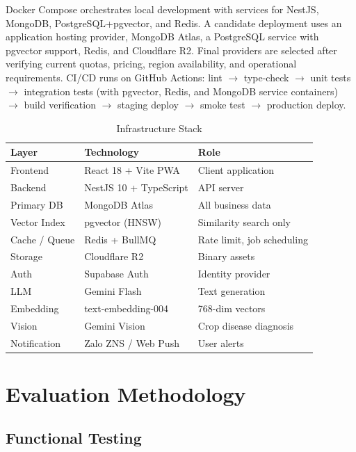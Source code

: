 \documentclass[conference]{IEEEtran}
\begin{document}
Docker Compose orchestrates local development with services for NestJS, MongoDB, PostgreSQL+pgvector, and Redis. A candidate deployment uses an application hosting provider, MongoDB Atlas, a PostgreSQL service with pgvector support, Redis, and Cloudflare R2. Final providers are selected after verifying current quotas, pricing, region availability, and operational requirements. CI/CD runs on GitHub Actions: lint $\to$ type-check $\to$ unit tests $\to$ integration tests (with pgvector, Redis, and MongoDB service containers) $\to$ build verification $\to$ staging deploy $\to$ smoke test $\to$ production deploy.

\begin{table}[htbp]
\caption{Infrastructure Stack}
\label{tab:stack}
\centering
\begin{tabular}{lll}
\toprule
\textbf{Layer} & \textbf{Technology} & \textbf{Role} \\
\midrule
Frontend & React 18 + Vite PWA & Client application \\
Backend & NestJS 10 + TypeScript & API server \\
Primary DB & MongoDB Atlas & All business data \\
Vector Index & pgvector (HNSW) & Similarity search only \\
Cache / Queue & Redis + BullMQ & Rate limit, job scheduling \\
Storage & Cloudflare R2 & Binary assets \\
Auth & Supabase Auth & Identity provider \\
LLM & Gemini Flash & Text generation \\
Embedding & text-embedding-004 & 768-dim vectors \\
Vision & Gemini Vision & Crop disease diagnosis \\
Notification & Zalo ZNS / Web Push & User alerts \\
\bottomrule
\end{tabular}
\end{table}

\section{Evaluation Methodology}

\subsection{Functional Testing}
\end{document}
